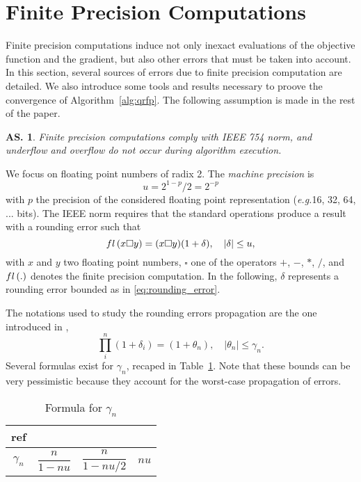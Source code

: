 \documentclass{article}[12pt]
\newtheorem{assumption}[]{\textbf{AS.}}
\begin{document}
	\section{Finite Precision Computations}
	Finite precision computations induce not only inexact evaluations of the objective function and the gradient, but also other errors that must be taken into account. In this section, several sources of errors due to finite precision computation are detailed. We also introduce some tools and results necessary to proove the convergence of Algorithm~\ref{alg:qrfp}. The following assumption is made in the rest of the paper.
	\begin{assumption}
		Finite precision computations comply with IEEE 754 norm, and underflow and overflow do not occur during algorithm execution. 
	\end{assumption}
	We focus on floating point numbers of radix 2. The \emph{machine precision} is 
	\begin{equation*}
		u = 2^{1-p}/2 = 2^{-p}
	\end{equation*}
	with $p$ the precision of the considered floating point representation (\emph{e.g.}16, 32, 64, ... bits). The IEEE norm requires that the standard operations produce a result with a rounding error such that 
	\begin{equation}
		\label{eq:rounding_error}
		fl\left(x\square y\right) = (x\square y)(1+\delta), \quad |\delta|\leq u,
	\end{equation}
	with $x$ and $y$ two floating point numbers, $\square$ one of the operators $+$, $-$, $*$, $/$, and $fl\left(.\right)$ denotes the finite precision computation. In the following, $\delta$ represents a rounding error bounded as in \eqref{eq:rounding_error}.
	
	The notations used to study the rounding errors propagation are the one introduced in \cite{higham2002accuracy},
	\begin{equation}
		\prod_{i}^{n} (1+\delta_i)= (1+\theta_n),\quad |\theta_n|\leq \gamma_n.
	\end{equation}
	Several formulas exist for $\gamma_n$, recaped in Table~\ref{tab:gamma_formula}. Note that these bounds can be very pessimistic because they account for the worst-case propagation of errors. 
	\begin{center}
		\begin{table}[H]
			\label{tab:gamma_formula}
			\caption{Formula for $\gamma_n$}
			\begin{tabular}{|c|c|c|c|}
				\hline
				ref & & & \\ \hline
				$\gamma_n$ & $\dfrac{n}{1-nu}$ & $\dfrac{n}{1-nu/2}$ & $nu$ \\ \hline
			\end{tabular}
		\end{table}
	\end{center}
	
\end{document}
